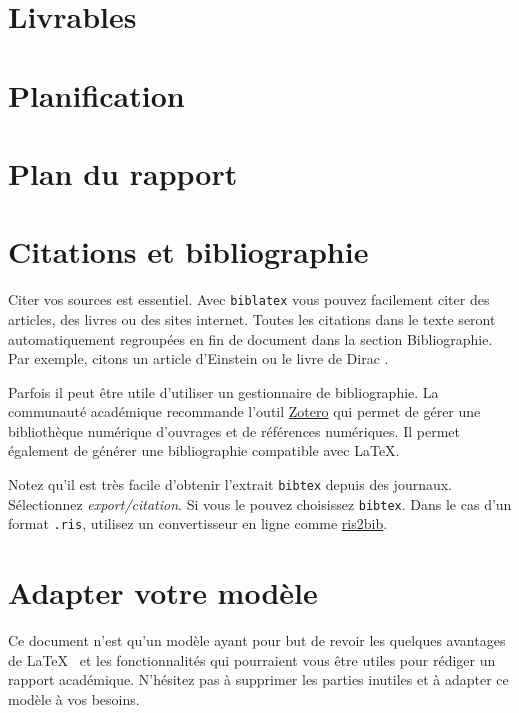 \section{Livrables}

\section{Planification}

\section{Plan du rapport}

\section{Citations et bibliographie}
Citer vos sources est essentiel. Avec \texttt{biblatex} vous pouvez facilement citer des articles, des livres ou des sites internet. Toutes les citations dans le texte seront automatiquement regroupées en fin de document dans la section \guillemotleft Bibliographie\guillemotright. Par exemple, citons un article d'Einstein \cite{einstein} ou le livre de Dirac \cite{dirac}.

Parfois il peut être utile d'utiliser un gestionnaire de bibliographie. La communauté académique recommande l'outil \href{https://www.zotero.org/}{Zotero} qui permet de gérer une bibliothèque numérique d'ouvrages et de références numériques. Il permet également de générer une bibliographie compatible avec \LaTeX.

Notez qu'il est très facile d'obtenir l'extrait \texttt{bibtex} depuis des journaux. Sélectionnez \emph{export/citation}. Si vous le pouvez choisissez \texttt{bibtex}. Dans le cas d'un format \texttt{.ris}, utilisez un convertisseur en ligne comme \href{http://www.bruot.org/ris2bib/}{ris2bib}.

\section{Adapter votre modèle}
Ce document n'est qu'un modèle ayant pour but de revoir les quelques avantages de \LaTeX~ et les fonctionnalités qui pourraient vous être utiles pour rédiger un rapport académique. N'hésitez pas à supprimer les parties inutiles et à adapter ce modèle à vos besoins.
